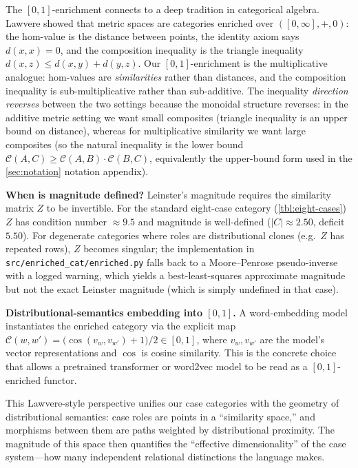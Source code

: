 \documentclass[
]{article}
\begin{document}
The \([0,1]\)-enrichment connects to a deep tradition in categorical
algebra. Lawvere showed that metric spaces are categories enriched over
\(([0, \infty], +, 0)\): the hom-value is the distance between points,
the identity axiom says \(d(x, x) = 0\), and the composition inequality
is the triangle inequality \(d(x, z) \leq d(x, y) + d(y, z)\). Our
\([0,1]\)-enrichment is the multiplicative analogue: hom-values are
\emph{similarities} rather than distances, and the composition
inequality is sub-multiplicative rather than sub-additive. The
inequality \emph{direction reverses} between the two settings because
the monoidal structure reverses: in the additive metric setting we want
small composites (triangle inequality is an upper bound on distance),
whereas for multiplicative similarity we want large composites (so the
natural inequality is the lower bound
\(\mathcal{C}(A,C) \ge \mathcal{C}(A,B)\cdot\mathcal{C}(B,C)\),
equivalently the upper-bound form used in the \autoref{sec:notation}
notation appendix).

\textbf{When is magnitude defined?} Leinster's magnitude requires the
similarity matrix \(Z\) to be invertible. For the standard eight-case
category (\autoref{tbl:eight-cases}) \(Z\) has condition number
\(\approx 9.5\) and magnitude is well-defined (\(|C| \approx 2.50\),
deficit \(5.50\)). For degenerate categories where roles are
distributional clones (e.g.~\(Z\) has repeated rows), \(Z\) becomes
singular; the implementation in \texttt{src/enriched\_cat/enriched.py}
falls back to a Moore--Penrose pseudo-inverse with a logged warning,
which yields a best-least-squares approximate magnitude but not the
exact Leinster magnitude (which is simply undefined in that case).

\textbf{Distributional-semantics embedding into \([0,1]\).} A
word-embedding model instantiates the enriched category via the explicit
map
\(\mathcal{C}(w, w') = \bigl(\cos(v_w, v_{w'}) + 1\bigr) / 2 \in [0,1]\),
where \(v_w, v_{w'}\) are the model's vector representations and
\(\cos\) is cosine similarity. This is the concrete choice that allows a
pretrained transformer or word2vec model to be read as a
\([0,1]\)-enriched functor.

This Lawvere-style perspective unifies our case categories with the
geometry of distributional semantics: case roles are points in a
``similarity space,'' and morphisms between them are paths weighted by
distributional proximity. The magnitude of this space then quantifies
the ``effective dimensionality'' of the case system---how many
independent relational distinctions the language makes.
\end{document}
